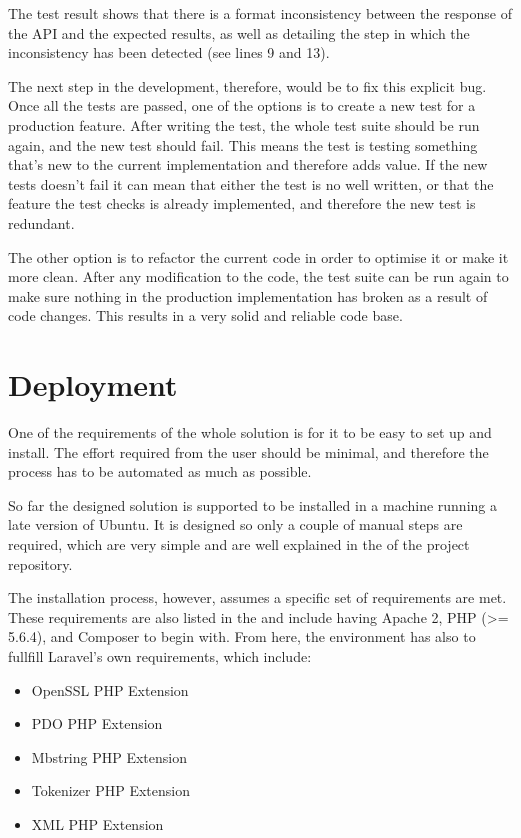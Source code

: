 The test result shows that there is a format inconsistency between the response of the API and the expected results, as well as detailing the step in which the inconsistency has been detected (see lines 9 and 13).

The next step in the development, therefore, would be to fix this explicit bug. Once all the tests are passed, one of the options is to create a new test for a production feature. After writing the test, the whole test suite should be run again, and the new test should fail. This means the test is testing something that’s new to the current implementation and therefore adds value. If the new tests doesn’t fail it can mean that either the test is no well written, or that the feature the test checks is already implemented, and therefore the new test is redundant.

The other option is to refactor the current code in order to optimise it or make it more clean. After any modification to the code, the test suite can be run again to make sure nothing in the production implementation has broken as a result of code changes. This results in a very solid and reliable code base.

\section{Deployment}
One of the requirements of the whole solution is for it to be easy to set up and install. The effort required from the user should be minimal, and therefore the process has to be automated as much as possible.

So far the designed solution is supported to be installed in a machine running a late version of Ubuntu. It is designed so only a couple of manual steps are required, which are very simple and are well explained in the  of the project repository.

The installation process, however, assumes a specific set of requirements are met. These requirements are also listed in the  and include having Apache 2, PHP (\textgreater= 5.6.4), and Composer to begin with. From here, the environment has also to fullfill Laravel's own requirements, which include:

\begin{itemize}
\item OpenSSL PHP Extension
\item PDO PHP Extension
\item Mbstring PHP Extension
\item Tokenizer PHP Extension
\item XML PHP Extension
\end{itemize}

